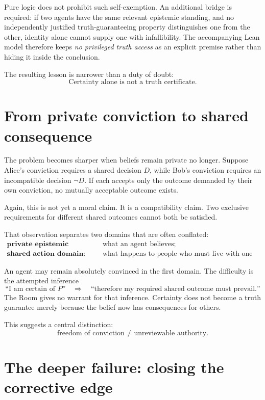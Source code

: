 \documentclass[11pt,a4paper]{article}
\begin{document}
Pure logic does not prohibit such self-exemption. An additional bridge is required: if two agents have the same relevant epistemic standing, and no independently justified truth-guaranteeing property distinguishes one from the other, identity alone cannot supply one with infallibility. The accompanying Lean model therefore keeps \emph{no privileged truth access} as an explicit premise rather than hiding it inside the conclusion.

The resulting lesson is narrower than a duty of doubt:
\[
\boxed{\text{Certainty alone is not a truth certificate.}}
\]

\section{From private conviction to shared consequence}

The problem becomes sharper when beliefs remain private no longer. Suppose Alice's conviction requires a shared decision $D$, while Bob's conviction requires an incompatible decision $\neg D$. If each accepts only the outcome demanded by their own conviction, no mutually acceptable outcome exists.

Again, this is not yet a moral claim. It is a compatibility claim. Two exclusive requirements for different shared outcomes cannot both be satisfied.

That observation separates two domains that are often conflated:
\begin{align*}
\textbf{private epistemic domain:}&\quad \text{what an agent believes;}\\
\textbf{shared action domain:}&\quad \text{what happens to people who must live with one outcome.}
\end{align*}

An agent may remain absolutely convinced in the first domain. The difficulty is the attempted inference
\[
\text{``I am certain of }P\text{''}\quad\Longrightarrow\quad
\text{``therefore my required shared outcome must prevail.''}
\]
The Room gives no warrant for that inference. Certainty does not become a truth guarantee merely because the belief now has consequences for others.

This suggests a central distinction:
\[
\boxed{\text{freedom of conviction} \neq \text{unreviewable authority}.}
\]

\section{The deeper failure: closing the corrective edge}
\end{document}
